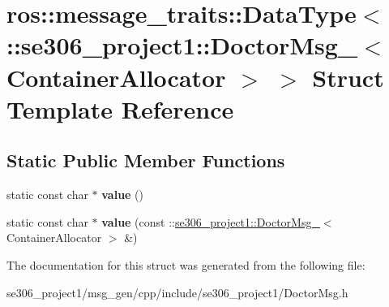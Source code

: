 \hypertarget{structros_1_1message__traits_1_1DataType_3_01_1_1se306__project1_1_1DoctorMsg___3_01ContainerAllocator_01_4_01_4}{\section{ros\-:\-:message\-\_\-traits\-:\-:Data\-Type$<$ \-:\-:se306\-\_\-project1\-:\-:Doctor\-Msg\-\_\-$<$ Container\-Allocator $>$ $>$ Struct Template Reference}
\label{structros_1_1message__traits_1_1DataType_3_01_1_1se306__project1_1_1DoctorMsg___3_01ContainerAllocator_01_4_01_4}
}
\subsection*{Static Public Member Functions}
\begin{DoxyCompactItemize}
\item 
\hypertarget{structros_1_1message__traits_1_1DataType_3_01_1_1se306__project1_1_1DoctorMsg___3_01ContainerAllocator_01_4_01_4_ad3eea037c0d845107620384a6a188ed0}{static const char $\ast$ {\bfseries value} ()}\label{structros_1_1message__traits_1_1DataType_3_01_1_1se306__project1_1_1DoctorMsg___3_01ContainerAllocator_01_4_01_4_ad3eea037c0d845107620384a6a188ed0}

\item 
\hypertarget{structros_1_1message__traits_1_1DataType_3_01_1_1se306__project1_1_1DoctorMsg___3_01ContainerAllocator_01_4_01_4_ab08d23c5013ac40731f32b595e825e5b}{static const char $\ast$ {\bfseries value} (const \-::\hyperlink{structse306__project1_1_1DoctorMsg__}{se306\-\_\-project1\-::\-Doctor\-Msg\-\_\-}$<$ Container\-Allocator $>$ \&)}\label{structros_1_1message__traits_1_1DataType_3_01_1_1se306__project1_1_1DoctorMsg___3_01ContainerAllocator_01_4_01_4_ab08d23c5013ac40731f32b595e825e5b}

\end{DoxyCompactItemize}


The documentation for this struct was generated from the following file\-:\begin{DoxyCompactItemize}
\item 
se306\-\_\-project1/msg\-\_\-gen/cpp/include/se306\-\_\-project1/Doctor\-Msg.\-h\end{DoxyCompactItemize}
